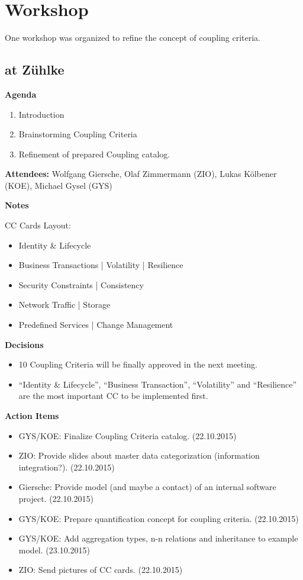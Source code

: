 \section{Workshop}

One workshop was organized to refine the concept of coupling criteria.

\subsection{ at Z\"uhlke}

\textbf{Agenda}

\begin{enumerate}
\item Introduction
\item Brainstorming Coupling Criteria
\item Refinement of prepared Coupling catalog.
\end{enumerate}

\textbf{Attendees:} Wolfgang Giersche, Olaf Zimmermann (ZIO), Lukas Kölbener (KOE), Michael Gysel (GYS)

\textbf{Notes}

CC Cards Layout:

\begin{itemize}
\item Identity \& Lifecycle
\item Business Transactions | Volatility | Resilience
\item Security Constraints | Consistency
\item Network Traffic | Storage
\item Predefined Services | Change Management
\end{itemize}


\textbf{Decisions}

\begin{itemize}
\item 10 Coupling Criteria will be finally approved in the next meeting.
\item \enquote{Identity \& Lifecycle}, \enquote{Business Transaction}, \enquote{Volatility} and \enquote{Resilience} are the most important CC to be implemented first.
\end{itemize}

\textbf{Action Items}

\begin{itemize}
\item GYS/KOE: Finalize Coupling Criteria catalog. (22.10.2015)
\item ZIO: Provide slides about master data categorization (information integration?). (22.10.2015)
\item Giersche: Provide model (and maybe a contact) of an internal software project. (22.10.2015)
\item GYS/KOE: Prepare quantification concept for coupling criteria. (22.10.2015)
\item GYS/KOE: Add aggregation types, n-n relations and inheritance to example model. (23.10.2015)
\item ZIO: Send pictures of CC cards. (22.10.2015)
\end{itemize}
